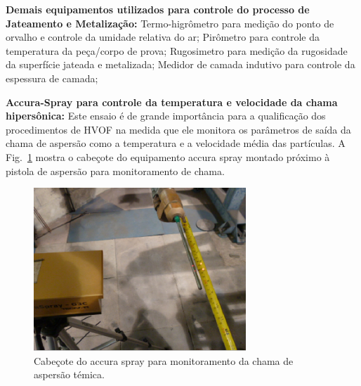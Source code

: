 \textbf{Demais equipamentos utilizados para controle do processo de
Jateamento e Metalização:}
Termo-higrômetro para medição do ponto de orvalho e controle da umidade relativa do ar;
Pirômetro para controle da temperatura da peça/corpo de prova;
Rugosimetro para medição da rugosidade da superfície jateada e metalizada;
Medidor de camada indutivo para controle da espessura de camada;

\textbf{Accura-Spray para controle da temperatura e velocidade da chama
hipersônica:} Este ensaio é de grande importância para a qualificação dos
procedimentos de HVOF na medida que ele monitora os parâmetros de saída da chama de aspersão
como a temperatura e a velocidade média das partículas. A
Fig.~\ref{fig:proj_hvof_6} mostra o cabeçote do equipamento accura spray
montado próximo à pistola de aspersão para monitoramento de chama.

\begin{figure}
	\centering
	\includegraphics[width=0.7\columnwidth]{sota/figs/projeto/proj_hvof_6.png}
    \caption{Cabeçote do accura spray para monitoramento da chama de aspersão
    témica.}
    \label{fig:proj_hvof_6}
\end{figure}